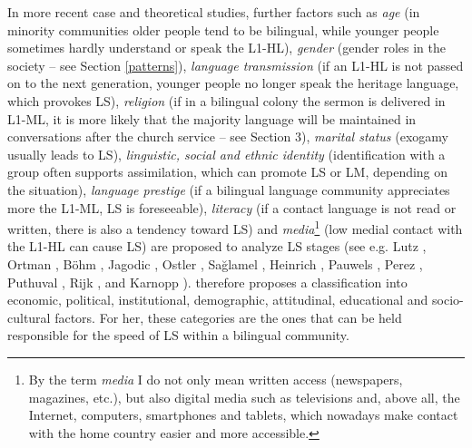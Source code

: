 \documentclass[output=paper,
modfonts
]{langscibook}
\begin{document}
In more recent case and theoretical studies, further factors such as \emph{age} (in minority communities older people tend to be bilingual, while younger people sometimes hardly understand or speak the L1-HL), \emph{gender} (gender roles in the society -- see Section \ref{patterns}), \emph{language transmission} (if an L1-HL is not passed on to the next generation, younger people no longer speak the heritage language, which provokes LS), \emph{religion} (if in a bilingual colony the sermon is delivered in L1-ML, it is more likely that the majority language will be maintained in conversations after the church service -- see Section 3), \emph{marital status} (exogamy usually leads to LS), \emph{linguistic, social and ethnic identity} (identification with a group often supports assimilation, which can promote LS or LM, depending on the situation), \emph{language prestige} (if a bilingual language community appreciates more the L1-ML, LS is foreseeable), \emph{literacy} (if a contact language is not read or written, there is also a tendency toward LS) and \emph{media}\footnote{By the term \emph{media} I do not only mean written access (newspapers, magazines, etc.), but also digital media such as televisions and, above all, the Internet, computers, smartphones and tablets, which nowadays make contact with the home country easier and more accessible.} (low medial contact with the L1-HL can cause LS) are proposed to analyze LS stages (see e.g. Lutz \citeyear{Lutz2006}, Ortman \citeyear{Ortman2008}, Böhm \citeyear{Bohm2010}, Jagodic \citeyear{Jagodic2011}, Ostler \citeyear{Ostler2011}, Sağlamel \citeyear{Sağlamel2013}, Heinrich \citeyear{Heinrich2015}, Pauwels \citeyear{Pauwels2016}, Perez \citeyear{Perez2016}, Puthuval \citeyear{Puthuval2017}, Rijk \citeyear{VanRijk2017}, and Karnopp \citeyear{Karnopp}). \cite*{Holmes2013} therefore proposes a classification into economic, political, institutional, demographic, attitudinal, educational and socio-cultural factors. For her, these categories are the ones that can be held responsible for the speed of LS within a bilingual community.
\end{document}
